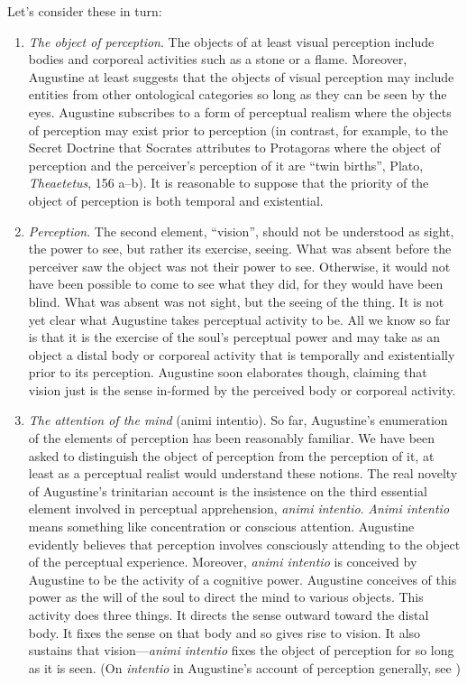 \documentclass[12pt]{article}
\begin{document}
Let's consider these in turn:
\begin{enumerate}[(1)]
	\item \emph{The object of perception}. The objects of at least visual perception include bodies and corporeal activities such as a stone or a flame. Moreover, Augustine at least suggests that the objects of visual perception may include entities from other ontological categories so long as they can be seen by the eyes. Augustine subscribes to a form of perceptual realism where the objects of perception may exist prior to perception (in contrast, for example, to the Secret Doctrine that Socrates attributes to Protagoras where the object of perception and the perceiver's perception of it are ``twin births'', Plato, \emph{Theaetetus}, 156 a--b). It is reasonable to suppose that the priority of the object of perception is both temporal and existential.
	\item \emph{Perception}. The second element, ``vision'', should not be understood as sight, the power to see, but rather its exercise, seeing. What was absent before the perceiver saw the object was not their power to see. Otherwise, it would not have been possible to come to see what they did, for they would have been blind. What was absent was not sight, but the seeing of the thing. It is not yet clear what Augustine takes perceptual activity to be. All we know so far is that it is the exercise of the soul's perceptual power and may take as an object a distal body or corporeal activity that is temporally and existentially prior to its perception. Augustine soon elaborates though, claiming that vision just is the sense in-formed by the perceived body or corporeal activity.
	\item \emph{The attention of the mind} (animi intentio). So far, Augustine's enumeration of the elements of perception has been reasonably familiar. We have been asked to distinguish the object of perception from the perception of it, at least as a perceptual realist would understand these notions. The real novelty of Augustine's trinitarian account is the insistence on the third essential element involved in perceptual apprehension, \emph{animi intentio}. \emph{Animi intentio} means something like concentration or conscious attention. Augustine evidently believes that perception involves consciously attending to the object of the perceptual experience. Moreover, \emph{animi intentio} is conceived by Augustine to be the activity of a cognitive power. Augustine conceives of this power as the will of the soul to direct the mind to various objects. This activity does three things. It directs the sense outward toward the distal body. It fixes the sense on that body and so gives rise to vision. It also sustains that vision---\emph{animi intentio} fixes the object of perception for so long as it is seen. (On \emph{intentio} in Augustine's account of perception generally, see \citealt[chapter 3.2]{ODaly:1987fq})
\end{enumerate}
\end{document}
